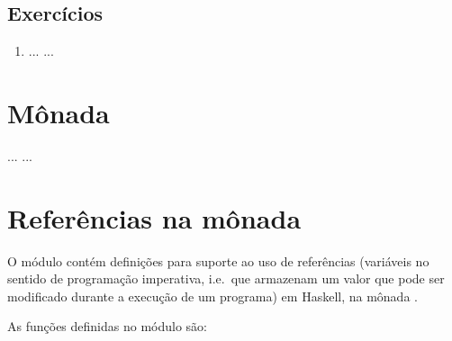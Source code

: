 \begin{enumerate}
%


\end{enumerate}

\subsection{Exercícios}
\label{ex-IO}

\begin{enumerate}

\item ... ... 

\end{enumerate}

\section{Mônada \Maybe}
\label{Monada-Maybe}

... ...

\section{Referências na mônada \IO}

O módulo  contém definições para suporte ao uso de
referências (variáveis no sentido de programação imperativa, i.e.~que
armazenam um valor que pode ser modificado durante a execução de um
programa) em Haskell, na mônada .

As funções definidas no módulo  são:

